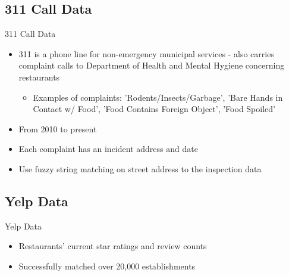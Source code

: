 \documentclass{beamer}
\begin{document}
\subsection{311 Call Data}
\begin{frame}{311 Call Data}
\begin{itemize}
\item 311 is a phone line for non-emergency municipal services - also carries complaint calls to Department of Health and Mental Hygiene concerning restaurants
\begin{itemize}
\item Examples of complaints: 'Rodents/Insects/Garbage', 'Bare Hands in Contact w/ Food', 'Food Contains Foreign Object', 'Food Spoiled'
\end{itemize}
\item From 2010 to present
\item Each complaint has an incident address and date
\item Use fuzzy string matching on street address to the inspection data
\end{itemize}
\end{frame}

\subsection{Yelp Data}
\begin{frame}{Yelp Data}
\begin{itemize}
\item Restaurants' current star ratings and review counts
\item Successfully matched over 20,000 establishments
\end{itemize}
\end{frame}

\end{document}
